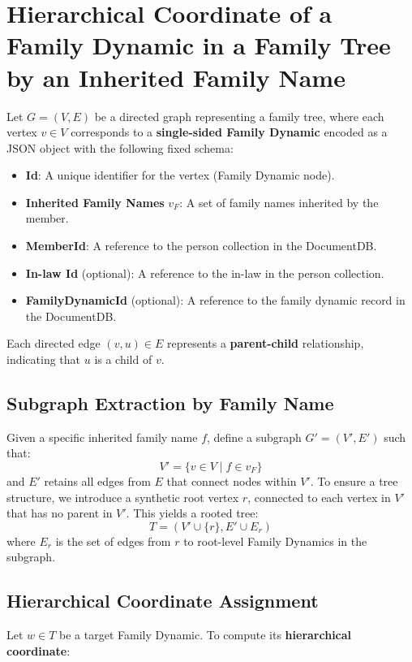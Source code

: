 \documentclass{article}
\begin{document}
\section*{Hierarchical Coordinate of a Family Dynamic in a Family Tree by an Inherited Family Name}

Let \( G = (V, E) \) be a directed graph representing a family tree, where each vertex \( v \in V \) corresponds to a \textbf{single-sided Family Dynamic} encoded as a JSON object with the following fixed schema:
\begin{itemize}
    \item \textbf{Id}: A unique identifier for the vertex (Family Dynamic node).
    \item \textbf{Inherited Family Names} \( v_F \): A set of family names inherited by the member.
    \item \textbf{MemberId}: A reference to the person collection in the DocumentDB.
    \item \textbf{In-law Id} (optional): A reference to the in-law in the person collection.
    \item \textbf{FamilyDynamicId} (optional): A reference to the family dynamic record in the DocumentDB.
\end{itemize}

Each directed edge \( (v, u) \in E \) represents a \textbf{parent-child} relationship, indicating that \( u \) is a child of \( v \).

\subsection*{Subgraph Extraction by Family Name}

Given a specific inherited family name \( f \), define a subgraph \( G' = (V', E') \) such that:
\[
V' = \{ v \in V \mid f \in v_F \}
\]
and \( E' \) retains all edges from \( E \) that connect nodes within \( V' \). To ensure a tree structure, we introduce a synthetic root vertex \( r \), connected to each vertex in \( V' \) that has no parent in \( V' \). This yields a rooted tree:
\[
T = (V' \cup \{r\}, E' \cup E_r)
\]
where \( E_r \) is the set of edges from \( r \) to root-level Family Dynamics in the subgraph.

\subsection*{Hierarchical Coordinate Assignment}

Let \( w \in T \) be a target Family Dynamic. To compute its \textbf{hierarchical coordinate}:
\end{document}
